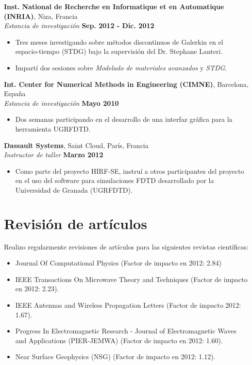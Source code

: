 \documentclass[a4paper,margin,line]{res}
\begin{document}
\begin{resume}
{\bf Inst. National de Recherche en Informatique et en Automatique (INRIA)}, Niza, Francia\\
{\em Estancia de investigación} \hfill {\bf Sep. 2012 - Dic. 2012}\\
\begin{itemize}
 \item Tres meses investigando sobre métodos discontinuos de Galerkin en el espacio-tiempo (STDG) bajo la supervisión del Dr. Stephane Lanteri.
 \item Impartí dos sesiones sobre {\it Modelado de materiales avanzados} y {\it STDG}.
\end{itemize}

{\bf Int. Center for Numerical Methods in Engineering (CIMNE)}, Barcelona, España\\
{\em Estancia de investigación} \hfill {\bf Mayo 2010}\\
\begin{itemize}
 \item Dos semanas participando en el desarrollo de una interfaz gráfica para la herramienta UGRFDTD.
\end{itemize}

{\bf Dassault Systems}, Saint Cloud, París, Francia\\
\vspace{-.3cm}
{\em Instructor de taller} \hfill {\bf Marzo 2012}\\
\begin{itemize}
 \item Como parte del proyecto HIRF-SE, instruí a otros participantes del proyecto en el uso del software para simulaciones FDTD desarrollado por la Universidad de Granada (UGRFDTD).
\end{itemize}

\begin{minipage}{\textwidth}
\section{\sc Revisión de artículos}
Realizo regularmente revisiones de artículos para las siguientes revistas científicas:
\begin{itemize}
 \item Journal Of Computational Physics (Factor de impacto en 2012: 2.84)
 \item IEEE Transactions On Microwave Theory and Techniques (Factor de impacto en 2012: 2.23).
 \item IEEE Antennas and Wireless Propagation Letters (Factor de impacto 2012: 1.67).
 \item Progress In Electromagnetic Research - Journal of Electromagnetic Waves and Applications (PIER-JEMWA) (Factor de impacto en 2012: 1.60).
 \item Near Surface Geophysics (NSG) (Factor de impacto en 2012: 1.12).
\end{itemize}
\end{minipage}


\end{resume}
\end{document}
